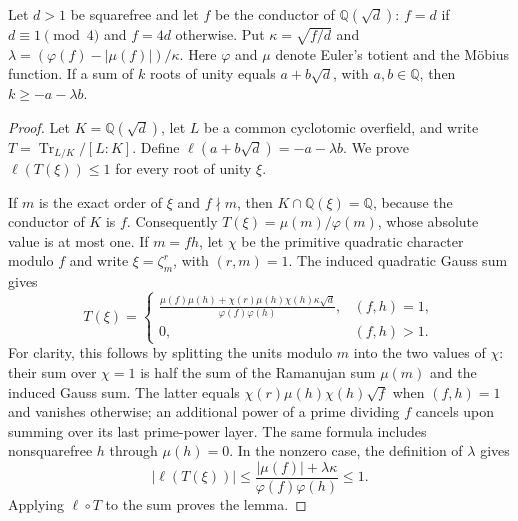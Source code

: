 \begin{lemma}\label{lem:odd-quadratic-length}
Let $d>1$ be squarefree and let $f$ be the conductor of $\mathbb Q(\sqrt d)$:
$f=d$ if $d\equiv1\pmod4$ and $f=4d$ otherwise. Put
$\kappa=\sqrt{f/d}$ and $\lambda=(\varphi(f)-|\mu(f)|)/\kappa$.
Here $\varphi$ and $\mu$ denote Euler's totient and the M\"obius function.
If a sum of $k$ roots of unity equals $a+b\sqrt d$, with
$a,b\in\mathbb Q$, then $k\geq-a-\lambda b$.
\end{lemma}
\begin{proof}
Let $K=\mathbb Q(\sqrt d)$, let $L$ be a common cyclotomic overfield, and
write $T=\operatorname{Tr}_{L/K}/[L:K]$. Define
$\ell(a+b\sqrt d)=-a-\lambda b$. We prove $\ell(T(\xi))\leq1$
for every root of unity $\xi$.

If $m$ is the exact order of $\xi$ and $f\nmid m$, then
$K\cap\mathbb Q(\xi)=\mathbb Q$, because the conductor of $K$ is $f$.
Consequently $T(\xi)=\mu(m)/\varphi(m)$, whose absolute value is at most one.
If $m=fh$, let $\chi$ be the primitive quadratic character modulo $f$ and
write $\xi=\zeta_m^r$, with $(r,m)=1$. The induced quadratic Gauss sum gives
\[
 T(\xi)=
 \begin{cases}
 \displaystyle\frac{\mu(f)\mu(h)+\chi(r)\mu(h)\chi(h)\kappa\sqrt d}
                      {\varphi(f)\varphi(h)},&(f,h)=1,\\[6pt]
 0,&(f,h)>1.
 \end{cases}
\]
For clarity, this follows by splitting the units modulo $m$ into the two
values of $\chi$: their sum over $\chi=1$ is half the sum of the Ramanujan
sum $\mu(m)$ and the induced Gauss sum. The latter equals
$\chi(r)\mu(h)\chi(h)\sqrt f$ when $(f,h)=1$ and vanishes otherwise;
an additional power of a prime dividing $f$ cancels upon summing over its
last prime-power layer. The same formula includes nonsquarefree $h$ through
$\mu(h)=0$.
In the nonzero case, the definition of $\lambda$ gives
\[
 |\ell(T(\xi))|
 \leq\frac{|\mu(f)|+\lambda\kappa}{\varphi(f)\varphi(h)}\leq1.
\]
Applying $\ell\circ T$ to the sum proves the lemma.
\end{proof}



